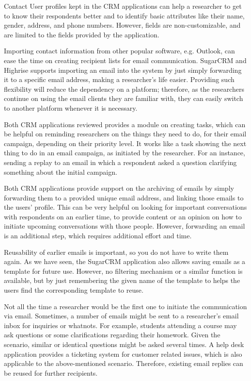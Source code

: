 \begin{compactitem}
	\item Contact User profiles kept in the \ac{CRM} applications can help a researcher to get to know their respondents better and to identify basic attributes like their name, gender, address, and phone numbers. However, fields are non-customizable, and are limited to the fields provided by the application.
	\item Importing contact information from other popular software, e.g. Outlook, can ease the time on creating recipient lists for email communication. SugarCRM and Highrise supports importing an email into the system by just simply forwarding it to a specific email address, making a researcher's life easier. Providing such flexibility will reduce the dependency on a platform; therefore, as the researchers continue on using the email clients they are familiar with, they can easily switch to another platform whenever it is necessary.
	\item Both \ac{CRM} applications reviewed provides a module on creating tasks, which can be helpful on reminding researchers on the things they need to do, for their email campaign, depending on their priority level. It works like a task showing the next thing to do in an email campaign, as initiated by the researcher. For an instance, sending a replay to an email in which a respondent asked a question clarifying something about the initial campaign.
	\item Both \ac{CRM} applications provide support on the archiving of emails by simply forwarding them to a provided unique email address, and linking those emails to the users' profile. This can be very helpful on looking for important conversations with respondents on an earlier time, to provide content or an opinion on how to initiate upcoming conversations with those people. However, forwarding an email is an additional step, which requires additional effort and time.
	\item Reusability of earlier emails is important, so you do not have to write them again. As we have seen, the SugarCRM application also allows saving emails as a template for future use. However, no filtering mechanism or a similar function is available, but by just remembering the given name of the template to helps the users find the corresponding template to reuse.
	\item Not all the time a researcher would be the first one to initiate the communication via email. Sometimes, a number of emails might be sent to a researcher's email inbox for inquiries or whatnots. For example, students attending a course may ask questions or some clarifications regarding their homework. Given the scenario, similar or identical questions might be asked several times. A help desk application provides a ticketing system for customer related issues, which is also applicable to the above-mentioned scenario. Therefore, existing email replies can be reused for further recipients.

\end{compactitem}

